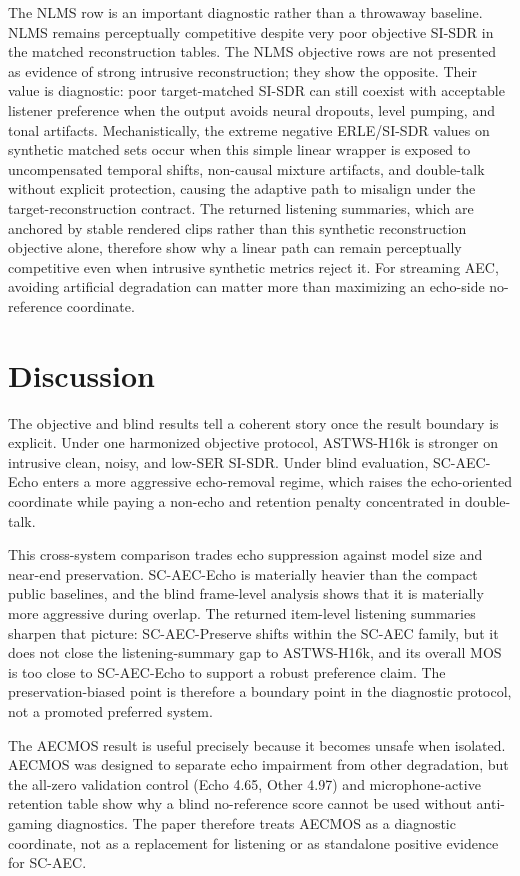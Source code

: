 \documentclass[journal]{IEEEtran}
\begin{document}
The NLMS row is an important diagnostic rather than a throwaway baseline. NLMS remains perceptually competitive despite very poor objective SI-SDR in the matched reconstruction tables. The NLMS objective rows are not presented as evidence of strong intrusive reconstruction; they show the opposite. Their value is diagnostic: poor target-matched SI-SDR can still coexist with acceptable listener preference when the output avoids neural dropouts, level pumping, and tonal artifacts. Mechanistically, the extreme negative ERLE/SI-SDR values on synthetic matched sets occur when this simple linear wrapper is exposed to uncompensated temporal shifts, non-causal mixture artifacts, and double-talk without explicit protection, causing the adaptive path to misalign under the target-reconstruction contract. The returned listening summaries, which are anchored by stable rendered clips rather than this synthetic reconstruction objective alone, therefore show why a linear path can remain perceptually competitive even when intrusive synthetic metrics reject it. For streaming AEC, avoiding artificial degradation can matter more than maximizing an echo-side no-reference coordinate.

\section{Discussion}
The objective and blind results tell a coherent story once the result boundary is explicit. Under one harmonized objective protocol, ASTWS-H16k is stronger on intrusive clean, noisy, and low-SER SI-SDR. Under blind evaluation, SC-AEC-Echo enters a more aggressive echo-removal regime, which raises the echo-oriented coordinate while paying a non-echo and retention penalty concentrated in double-talk.

This cross-system comparison trades echo suppression against model size and near-end preservation. SC-AEC-Echo is materially heavier than the compact public baselines, and the blind frame-level analysis shows that it is materially more aggressive during overlap. The returned item-level listening summaries sharpen that picture: SC-AEC-Preserve shifts within the SC-AEC family, but it does not close the listening-summary gap to ASTWS-H16k, and its overall MOS is too close to SC-AEC-Echo to support a robust preference claim. The preservation-biased point is therefore a boundary point in the diagnostic protocol, not a promoted preferred system.

The AECMOS result is useful precisely because it becomes unsafe when isolated. AECMOS was designed to separate echo impairment from other degradation, but the all-zero validation control (Echo 4.65, Other 4.97) and microphone-active retention table show why a blind no-reference score cannot be used without anti-gaming diagnostics. The paper therefore treats AECMOS as a diagnostic coordinate, not as a replacement for listening or as standalone positive evidence for SC-AEC.
\end{document}
